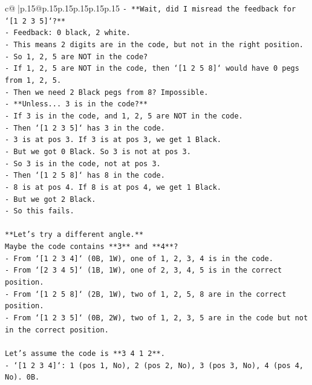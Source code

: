 \documentclass{article}
\begin{document}
{\begin{supertabular}{c@{$\;$}|p{.15\linewidth}@{}p{.15\linewidth}p{.15\linewidth}p{.15\linewidth}p{.15\linewidth}p{.15\linewidth}}
{{{\texttt{{-} **Wait, did I misread the feedback for `{[}1 2 3 5{]}`?**} \\
\texttt{{-} Feedback: 0 black, 2 white.} \\
\texttt{{-} This means 2 digits are in the code, but not in the right position.} \\
\texttt{{-} So 1, 2, 5 are NOT in the code?} \\
\texttt{{-} If 1, 2, 5 are NOT in the code, then `{[}1 2 5 8{]}` would have 0 pegs from 1, 2, 5.} \\
\texttt{{-} Then we need 2 Black pegs from 8? Impossible.} \\
\texttt{{-} **Unless... 3 is in the code?**} \\
\texttt{{-} If 3 is in the code, and 1, 2, 5 are NOT in the code.} \\
\texttt{{-} Then `{[}1 2 3 5{]}` has 3 in the code.} \\
\texttt{{-} 3 is at pos 3. If 3 is at pos 3, we get 1 Black.} \\
\texttt{{-} But we got 0 Black. So 3 is not at pos 3.} \\
\texttt{{-} So 3 is in the code, not at pos 3.} \\
\texttt{{-} Then `{[}1 2 5 8{]}` has 8 in the code.} \\
\texttt{{-} 8 is at pos 4. If 8 is at pos 4, we get 1 Black.} \\
\texttt{{-} But we got 2 Black.} \\
\texttt{{-} So this fails.} \\
\\ 
\texttt{**Let's try a different angle.**} \\
\texttt{Maybe the code contains **3** and **4**?} \\
\texttt{{-} From `{[}1 2 3 4{]}` (0B, 1W), one of 1, 2, 3, 4 is in the code.} \\
\texttt{{-} From `{[}2 3 4 5{]}` (1B, 1W), one of 2, 3, 4, 5 is in the correct position.} \\
\texttt{{-} From `{[}1 2 5 8{]}` (2B, 1W), two of 1, 2, 5, 8 are in the correct position.} \\
\texttt{{-} From `{[}1 2 3 5{]}` (0B, 2W), two of 1, 2, 3, 5 are in the code but not in the correct position.} \\
\\ 
\texttt{Let's assume the code is **3 4 1 2**.} \\
\texttt{{-} `{[}1 2 3 4{]}`: 1 (pos 1, No), 2 (pos 2, No), 3 (pos 3, No), 4 (pos 4, No). 0B.} \\
}}}
\end{supertabular}}
\end{document}

